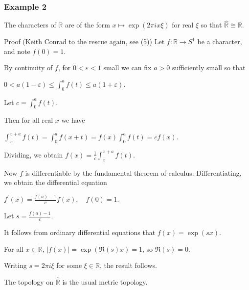 \documentclass[mathserif
, handout
]{beamer}
\begin{document}
\begin{frame}
    \frametitle{Example 2}
The characters of $\mathbb{R}$ are of the form $x\mapsto \exp(2\pi i x\xi)$ for real $\xi$ so that $\widehat{\mathbb{R}}\cong\mathbb{R}$.
\pause 
\begin{block}{Proof (Keith Conrad to the rescue again, see (5))} %
    Let $f \colon \mathbb{R}\to S^1$ be a character, and note $f(0) = 1$.\pause 

    By continuity of $f$, for $0<\varepsilon<1$ small we can fix $a>0$ sufficiently small so that \begin{center}
        $0<a(1-\varepsilon)\leq \int_0^a f(t)\leq a(1+\varepsilon)$.
    \end{center} Let $c = \int_0^a f(t)$.
\end{block}
\end{frame}

\begin{frame}
    \begin{block}{}
        Then for all real $x$ we have \begin{center}
            $\int_x^{x+a}f(t) = \int_0^a f(x+t) = f(x)\int_0^a f(t) = cf(x)$.
        \end{center} \pause 
        Dividing, we obtain $f(x) = \frac{1}{c}\int_x^{x+a}f(t)$. \pause

        Now $f$ is differentiable by the fundamental theorem of calculus. Differentiating, we obtain the differential equation \begin{center}
            $f^\prime(x) = \frac{f(a)-1}{c} f(x),\quad f(0) = 1$.
        \end{center} Let $s = \frac{f(a)-1}{c}$. \pause 

        It follows from ordinary differential equations that $f(x) = \exp(sx)$. \pause 

        For all $x\in \mathbb{R}$, $|f(x)|= \exp(\Re(s) x)=1$, so $\Re( s) = 0$. \pause 

        Writing $s = 2\pi i \xi$ for some $\xi\in \mathbb{R}$, the result follows. \pushQED{\qed}\qedhere\popQED
    \end{block} \pause The topology on $\widehat{\mathbb{R}}$ is the usual metric topology.
\end{frame}
\end{document}

